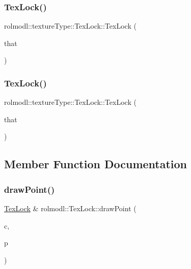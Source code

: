 \subsubsection{\texorpdfstring{TexLock()}{TexLock()}\hspace{0.1cm}{\footnotesize\ttfamily [4/5]}}
{\footnotesize\ttfamily rolmodl\+::texture\+Type\+::\+Tex\+Lock\+::\+Tex\+Lock (\begin{DoxyParamCaption}\item[{const \mbox{\hyperlink{classrolmodl_1_1texture_type_1_1_tex_lock}{Tex\+Lock}} \&}]{that }\end{DoxyParamCaption})\hspace{0.3cm}{\ttfamily [delete]}}

\mbox{\label{classrolmodl_1_1texture_type_1_1_tex_lock_ab9fdbdef0222e9da9192f095d79cfc3f}} 
\subsubsection{\texorpdfstring{TexLock()}{TexLock()}\hspace{0.1cm}{\footnotesize\ttfamily [5/5]}}
{\footnotesize\ttfamily rolmodl\+::texture\+Type\+::\+Tex\+Lock\+::\+Tex\+Lock (\begin{DoxyParamCaption}\item[{\mbox{\hyperlink{classrolmodl_1_1texture_type_1_1_tex_lock}{Tex\+Lock}} \&\&}]{that }\end{DoxyParamCaption})\hspace{0.3cm}{\ttfamily [noexcept]}}



\subsection{Member Function Documentation}
\mbox{\label{classrolmodl_1_1texture_type_1_1_tex_lock_ac4c9045b05cd2e86d25a67cd3099f0ca}} 
\subsubsection{\texorpdfstring{drawPoint()}{drawPoint()}}
{\footnotesize\ttfamily \mbox{\hyperlink{classrolmodl_1_1texture_type_1_1_tex_lock}{Tex\+Lock}} \& rolmodl\+::\+Tex\+Lock\+::draw\+Point (\begin{DoxyParamCaption}\item[{const \mbox{\hyperlink{structrolmodl_1_1_r_g_b_a}{R\+G\+BA}}}]{c,  }\item[{const \mbox{\hyperlink{structrolmodl_1_1geom_1_1_pos}{geom\+::\+Pos}}}]{p }\end{DoxyParamCaption})\hspace{0.3cm}{\ttfamily [noexcept]}}



